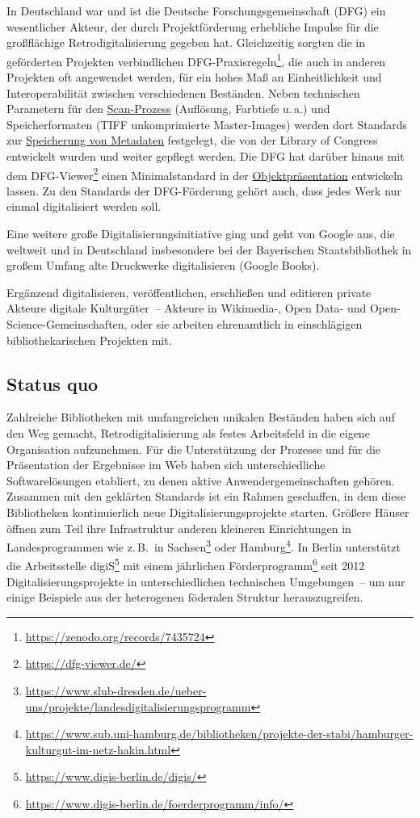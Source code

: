 \documentclass[
  11pt,
  letterpaper,
  DIV=11,
  twoside]{scrreprt}
\DeclareRobustCommand{\href}[2]{#2\footnote{\url{#1}}}
\begin{document}
In Deutschland war und ist die Deutsche Forschungsgemeinschaft (DFG) ein
wesentlicher Akteur, der durch Projektförderung erhebliche Impulse für
die großflächige Retrodigitalisierung gegeben hat. Gleichzeitig sorgten
die in geförderten Projekten verbindlichen
\href{https://zenodo.org/records/7435724}{DFG-Praxisregeln}, die auch in
anderen Projekten oft angewendet werden, für ein hohes Maß an
Einheitlichkeit und Interoperabilität zwischen verschiedenen Beständen.
Neben technischen Parametern für den
\hyperref[scanner-und-scanverfahren]{Scan-Prozess} (Auflösung, Farbtiefe
u.\,a.) und Speicherformaten (TIFF unkomprimierte Master-Images) werden
dort Standards zur \hyperref[metadaten-und-schnittstellen]{Speicherung
von Metadaten} festgelegt, die von der Library of Congress entwickelt
wurden und weiter gepflegt werden. Die DFG hat darüber hinaus mit dem
\href{https://dfg-viewer.de/}{DFG-Viewer} einen Minimalstandard in der
\hyperref[pruxe4sentieren]{Objektpräsentation} entwickeln lassen. Zu den
Standards der DFG-Förderung gehört auch, dass jedes Werk nur einmal
digitalisiert werden soll.

Eine weitere große Digitalisierungsinitiative ging und geht von Google
aus, die weltweit und in Deutschland insbesondere bei der Bayerischen
Staatsbibliothek in großem Umfang alte Druckwerke digitalisieren (Google
Books).

Ergänzend digitalisieren, veröffentlichen, erschließen und editieren
private Akteure digitale Kulturgüter~-- Akteure in Wikimedia-, Open
Data- und Open-Science-Gemeinschaften, oder sie arbeiten ehrenamtlich in
einschlägigen bibliothekarischen Projekten mit.

\subsection{Status quo}\label{status-quo}

Zahlreiche Bibliotheken mit umfangreichen unikalen Beständen haben sich
auf den Weg gemacht, Retrodigitalisierung als festes Arbeitsfeld in die
eigene Organisation aufzunehmen. Für die Unterstützung der Prozesse und
für die Präsentation der Ergebnisse im Web haben sich unterschiedliche
Softwarelösungen etabliert, zu denen aktive Anwendergemeinschaften
gehören. Zusammen mit den geklärten Standards ist ein Rahmen geschaffen,
in dem diese Bibliotheken kontinuierlich neue Digitalisierungsprojekte
starten. Größere Häuser öffnen zum Teil ihre Infrastruktur anderen
kleineren Einrichtungen in Landesprogrammen wie z.\,B.~in
\href{https://www.slub-dresden.de/ueber-uns/projekte/landesdigitalisierungsprogramm}{Sachsen}
oder
\href{https://www.sub.uni-hamburg.de/bibliotheken/projekte-der-stabi/hamburger-kulturgut-im-netz-hakin.html}{Hamburg}.
In Berlin unterstützt die Arbeitsstelle
\href{https://www.digis-berlin.de/digis/}{digiS} mit einem jährlichen
\href{https://www.digis-berlin.de/foerderprogramm/info/}{Förderprogramm}
seit 2012 Digitalisierungsprojekte in unterschiedlichen technischen
Umgebungen~-- um nur einige Beispiele aus der heterogenen föderalen
Struktur herauszugreifen.
\end{document}

